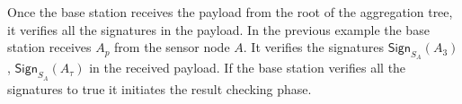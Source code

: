 
	Once the base station receives the payload from the root of the aggregation tree, it verifies all the signatures in the payload.
	In the previous example the base station receives $A_{p}$ from the sensor node $A$.
	It verifies the signatures $\textsf{Sign}_{S_{A}}(A_{3})$, $\textsf{Sign}_{S_{A}}(A_{\tau})$ in the received payload.	 
	If the base station verifies all the signatures to true it initiates the result checking phase.

